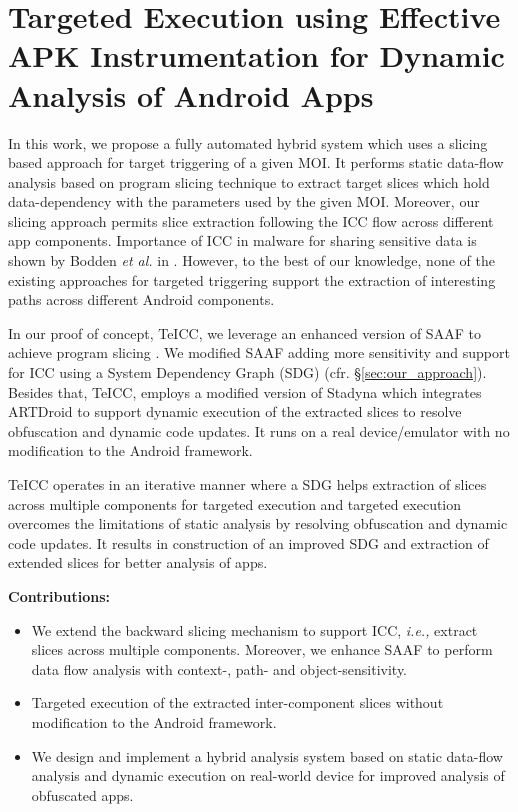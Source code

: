 \chapter{Targeted Execution using Effective APK Instrumentation for Dynamic Analysis of Android Apps}
\label{sec:teicc}

In this work, we propose a fully automated hybrid system which uses a slicing based approach for target triggering of a given MOI. It performs static data-flow analysis \cite{allen1976program,fosdick1976data} based on program slicing technique \cite{weiser1981program} to extract target slices which hold data-dependency with the parameters used by the given MOI. Moreover, our slicing approach permits slice extraction following the ICC flow across different app components. Importance of ICC in malware for sharing sensitive data is shown by Bodden \textit{et al.} in \cite{li2015iccta}. However, to the best of our knowledge, none of the existing approaches \cite{rasthofer2016harvesting, backes2016r} for targeted triggering support the extraction of interesting paths across different Android components.  

In our proof of concept, TeICC, we leverage an enhanced version of SAAF to achieve program slicing \cite{hoffmann2013slicing}. We modified SAAF adding more sensitivity and support for ICC using a System Dependency Graph (SDG) (cfr. \S \ref{sec:our_approach}). Besides that, TeICC, employs a modified version of Stadyna \cite{zhauniarovich2015stadyna} which integrates ARTDroid \cite{costamagnaartdroid} to support dynamic execution of the extracted slices to resolve obfuscation and dynamic code updates. It runs on a real device/emulator with no modification to the Android framework.

TeICC operates in an iterative manner where a SDG helps extraction of slices across multiple components for targeted execution and targeted execution overcomes the limitations of static analysis by resolving obfuscation and dynamic code updates. It results in construction of an improved SDG and extraction of extended slices for better analysis of apps. 

\textbf{Contributions:}
\begin{itemize}
\item We extend the backward slicing mechanism to support ICC, \textit{i.e.,} extract slices across multiple components. Moreover, we enhance SAAF to perform data flow analysis with context-, path- and  object-sensitivity.

\item Targeted execution of the extracted inter-component slices without modification to the Android framework.

\item We design and implement a hybrid analysis system based on static data-flow analysis and dynamic execution on real-world device for improved analysis of obfuscated apps.
\end{itemize}